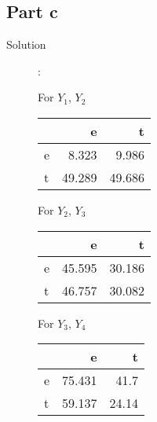 \documentclass[a4paper,11pt]{article}
\begin{document}
\subsection{Part c}
\begin{description}
  \item [Solution]: 

For $Y_1$, $Y_2$ \\
\begin{center}
\begin{tabular}{l|r|r}
 &e & t \\ \hline
e& 8.323& 9.986 \\
t&49.289&49.686
  \end{tabular}  
 \end{center}
 For $Y_2$, $Y_3$ \\
 \begin{center}
 \begin{tabular}{l|r|r}
 &e & t\\ \hline
e&  45.595 & 30.186\\
t&  46.757 & 30.082
  \end{tabular}  
 \end{center}
 For $Y_3$, $Y_4$ \\
 \begin{center}
 \begin{tabular}{l|r|r}
 &e & t\\\hline
e&  75.431 & 41.7  \\
t&  59.137 & 24.14 
  \end{tabular}  
 \end{center}
\end{description}
\end{document}

